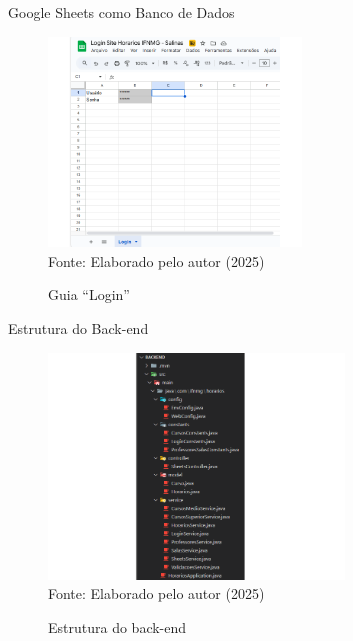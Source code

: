 \begin{frame}{Google Sheets como Banco de Dados}
    \begin{figure}
        \centering
        \vspace{-0.5cm}
        \caption{Guia ``Login''}
        \vspace{-0.2cm}
        \includegraphics[width=0.6\textwidth]{figuras/plan-4.png}
        \\ %
        \small Fonte: Elaborado pelo autor (2025)
    \end{figure}
\end{frame}

\begin{frame}{Estrutura do Back-end}
    \begin{figure}
        \centering
        \vspace{-0.5cm}
        \caption{Estrutura do back-end}
        \vspace{-0.2cm}
        \includegraphics[width=0.7\textwidth]{figuras/back-1.png}
        \\ %
        \small Fonte: Elaborado pelo autor (2025)
    \end{figure}
\end{frame}


